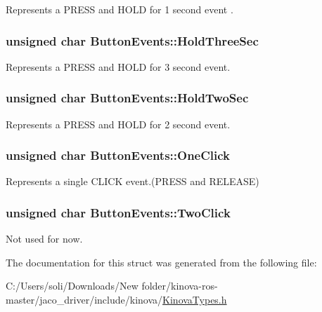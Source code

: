 Represents a P\+R\+E\+SS and H\+O\+LD for 1 second event . 

\subsubsection[{\texorpdfstring{Hold\+Three\+Sec}{HoldThreeSec}}]{\setlength{\rightskip}{0pt plus 5cm}unsigned char Button\+Events\+::\+Hold\+Three\+Sec}\hypertarget{struct_button_events_ab54e7f4ce7ac349f8a0fedaa82483e8f}{}\label{struct_button_events_ab54e7f4ce7ac349f8a0fedaa82483e8f}


Represents a P\+R\+E\+SS and H\+O\+LD for 3 second event. 

\subsubsection[{\texorpdfstring{Hold\+Two\+Sec}{HoldTwoSec}}]{\setlength{\rightskip}{0pt plus 5cm}unsigned char Button\+Events\+::\+Hold\+Two\+Sec}\hypertarget{struct_button_events_a0f52b2243f5ed9878283f83f5b8bd66b}{}\label{struct_button_events_a0f52b2243f5ed9878283f83f5b8bd66b}


Represents a P\+R\+E\+SS and H\+O\+LD for 2 second event. 

\subsubsection[{\texorpdfstring{One\+Click}{OneClick}}]{\setlength{\rightskip}{0pt plus 5cm}unsigned char Button\+Events\+::\+One\+Click}\hypertarget{struct_button_events_ae264a0be71f712b37a93e72693a807cd}{}\label{struct_button_events_ae264a0be71f712b37a93e72693a807cd}


Represents a single C\+L\+I\+CK event.(P\+R\+E\+SS and R\+E\+L\+E\+A\+SE) 

\subsubsection[{\texorpdfstring{Two\+Click}{TwoClick}}]{\setlength{\rightskip}{0pt plus 5cm}unsigned char Button\+Events\+::\+Two\+Click}\hypertarget{struct_button_events_a2feb3df7ddb99aeafd38cd80b18a9eee}{}\label{struct_button_events_a2feb3df7ddb99aeafd38cd80b18a9eee}


Not used for now. 



The documentation for this struct was generated from the following file\+:\begin{DoxyCompactItemize}
\item 
C\+:/\+Users/soli/\+Downloads/\+New folder/kinova-\/ros-\/master/jaco\+\_\+driver/include/kinova/\hyperlink{_kinova_types_8h}{Kinova\+Types.\+h}\end{DoxyCompactItemize}
